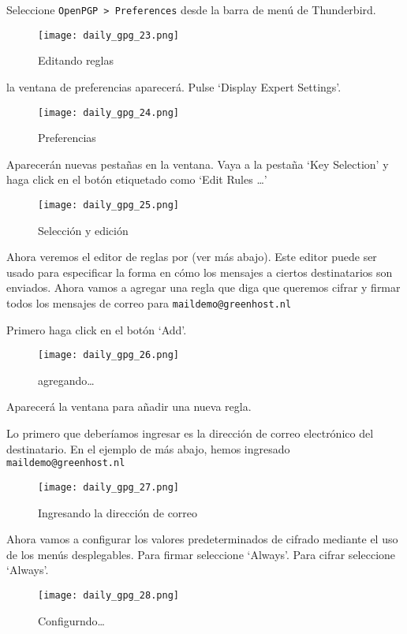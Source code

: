 \documentclass[10pt,a5paper,twoside,,]{book}
\begin{document}
Seleccione \texttt{OpenPGP\ \textgreater{}\ Preferences} desde la barra
de menú de Thunderbird.

\begin{figure}[htbp]
\centering
\texttt{[image: daily\_gpg\_23.png]}
\caption{Editando reglas}
\end{figure}

la ventana de preferencias aparecerá. Pulse `Display Expert Settings'.

\begin{figure}[htbp]
\centering
\texttt{[image: daily\_gpg\_24.png]}
\caption{Preferencias}
\end{figure}

Aparecerán nuevas pestañas en la ventana. Vaya a la pestaña `Key
Selection' y haga click en el botón etiquetado como `Edit Rules
\ldots{}'

\begin{figure}[htbp]
\centering
\texttt{[image: daily\_gpg\_25.png]}
\caption{Selección y edición}
\end{figure}

Ahora veremos el editor de reglas por (ver más abajo). Este editor puede
ser usado para especificar la forma en cómo los mensajes a ciertos
destinatarios son enviados. Ahora vamos a agregar una regla que diga que
queremos cifrar y firmar todos los mensajes de correo para
\texttt{maildemo@greenhost.nl}

Primero haga click en el botón `Add'.

\begin{figure}[htbp]
\centering
\texttt{[image: daily\_gpg\_26.png]}
\caption{agregando\ldots{}}
\end{figure}

Aparecerá la ventana para añadir una nueva regla.

Lo primero que deberíamos ingresar es la dirección de correo electrónico
del destinatario. En el ejemplo de más abajo, hemos ingresado
\texttt{maildemo@greenhost.nl}

\begin{figure}[htbp]
\centering
\texttt{[image: daily\_gpg\_27.png]}
\caption{Ingresando la dirección de correo}
\end{figure}

Ahora vamos a configurar los valores predeterminados de cifrado mediante
el uso de los menús desplegables. Para firmar seleccione `Always'. Para
cifrar seleccione `Always'.

\begin{figure}[htbp]
\centering
\texttt{[image: daily\_gpg\_28.png]}
\caption{Configurndo\ldots{}}
\end{figure}
\end{document}
